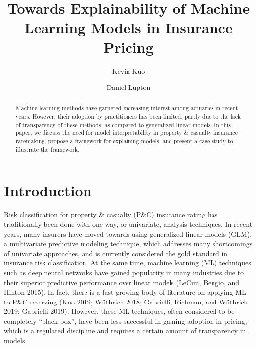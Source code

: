 \documentclass[preprint, 3p, twocolumn, letterpaper, 10pt]{elsarticle} %
\begin{document}
\begin{frontmatter}

  \title{Towards Explainability of Machine Learning Models in Insurance Pricing}
    \author[a]{Kevin Kuo}
    \author[b]{Daniel Lupton}
  
      \address[a]{Kasa AI, 3040 78th Ave SE \#1271, Mercer Island, WA 98040, USA}
    \address[b]{Taylor \& Mulder, 10508 Rivers Bend Lane, Potomac, MD 20854, USA}
  
  \begin{abstract}
  Machine learning methods have garnered increasing interest among actuaries in
  recent years. However, their adoption by practitioners has been limited, partly
  due to the lack of transparency of these methods, as compared to generalized
  linear models. In this paper, we discuss the need for model interpretability in
  property \& casualty insurance ratemaking, propose a framework for explaining
  models, and present a case study to illustrate the framework.
  \end{abstract}
  
 \end{frontmatter}

\hypertarget{introduction}{%
\section{Introduction}\label{introduction}}

Risk classification for property \& casualty (P\&C) insurance rating has traditionally
been done with one-way, or univariate, analysis techniques. In recent years, many
insurers have moved towards using generalized linear models (GLM), a multivariate
predictive modeling technique, which addresses many shortcomings of univariate
approaches, and is currently considered the gold standard in insurance risk
classification. At the same time, machine learning (ML) techniques such as deep
neural networks have gained popularity in many industries due to their superior
predictive performance over linear models (LeCun, Bengio, and Hinton 2015). In fact, there
is a fast growing body of literature on applying ML to P\&C reserving
(Kuo 2019; Wüthrich 2018; Gabrielli, Richman, and Wüthrich 2019; Gabrielli 2019). However, these ML techniques, often considered to be
completely ``black box'', have been less successful in gaining adoption in pricing,
which is a regulated discipline and requires a certain amount of transparency in models.
\end{document}
